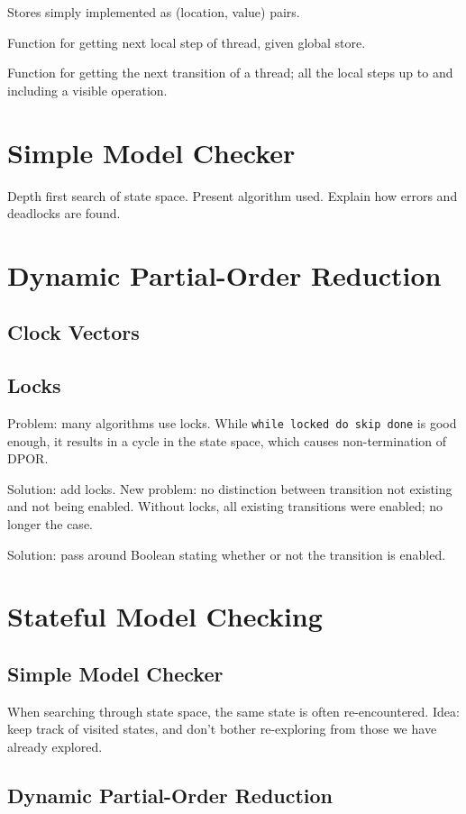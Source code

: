 \documentclass[12pt,a4paper,twoside,openright]{report}
\begin{document}
Stores simply implemented as (location, value) pairs.

Function for getting next local step of thread, given global store.

Function for getting the next transition of a thread; all the local
steps up to and including a visible operation.

\section{Simple Model Checker}

Depth first search of state space. Present algorithm used.
Explain how errors and deadlocks are found.

\section{Dynamic Partial-Order Reduction}

\subsection{Clock Vectors}
\subsection{Locks}
Problem: many algorithms use locks. While \texttt{while locked do skip done}
is good enough, it results in a cycle in the state space, which causes
non-termination of DPOR.

Solution: add locks. New problem: no distinction between
transition not existing and not being enabled. Without
locks, all existing transitions were enabled; no longer
the case.

Solution: pass around Boolean stating whether or not the transition
is enabled.

\section{Stateful Model Checking}

\subsection{Simple Model Checker}
When searching through state space, the same state is often
re-encountered. Idea: keep track of visited states, and don't bother
re-exploring from those we have already explored.

\subsection{Dynamic Partial-Order Reduction}
\end{document}
